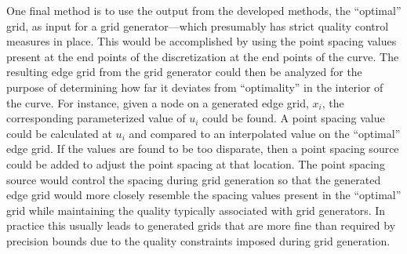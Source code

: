 One final method is to use the output from the developed methods, 
the ``optimal'' grid, as input for a grid generator—which presumably has 
strict quality control measures in place.  This would be accomplished by 
using the point spacing values present at the end points of the 
discretization at the end points of the curve.  The resulting edge grid 
from the grid generator could then be analyzed for the purpose of 
determining how far it deviates from ``optimality'' in the interior of the 
curve.  For instance, given a node on a generated edge grid, $x_i$, the 
corresponding parameterized value of $u_i$ could be found.  A point 
spacing value could be calculated at $u_i$ and compared to an interpolated 
value on the ``optimal'' edge grid.  If the values are found to be too 
disparate, then a point spacing source could be added to adjust the point 
spacing at that location.  The point spacing source would control the 
spacing during grid generation so that the generated edge grid would more 
closely resemble the spacing values present in the ``optimal'' grid while 
maintaining the quality typically associated with grid generators. In 
practice this usually leads to generated grids that are more fine than 
required by precision bounds due to the quality constraints imposed during 
grid generation.

